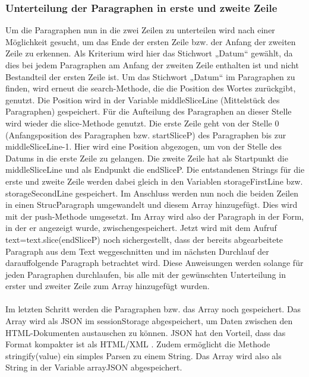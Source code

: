 \subsubsection{Unterteilung der Paragraphen in erste und zweite Zeile}
Um die Paragraphen nun in die zwei Zeilen zu unterteilen wird nach einer Möglichkeit gesucht, um das Ende der ersten Zeile bzw. der Anfang der zweiten Zeile zu erkennen. Als Kriterium wird hier das Stichwort „Datum“ gewählt, da dies bei jedem Paragraphen am Anfang der zweiten Zeile enthalten ist und nicht Bestandteil der ersten Zeile ist. Um das Stichwort „Datum“ im Paragraphen zu finden, wird erneut die search-Methode, die die Position des Wortes zurückgibt, genutzt. Die Position wird in der Variable middleSliceLine (Mittelstück des Paragraphen) gespeichert. Für die Aufteilung des Paragraphen an dieser Stelle wird wieder die slice-Methode genutzt. Die erste Zeile geht von der Stelle 0 (Anfangsposition des Paragraphen bzw. startSliceP) des Paragraphen bis zur middleSliceLine-1. Hier wird eine Position abgezogen, um von der Stelle des Datums in die erste Zeile zu gelangen. Die zweite Zeile hat als Startpunkt die middleSliceLine und als Endpunkt die endSliceP. Die entstandenen Strings für die erste und zweite Zeile werden dabei gleich in den Variablen storageFirstLine bzw. storageSecondLine gespeichert. Im Anschluss werden nun noch die beiden Zeilen in einen StrucParagraph umgewandelt und diesem Array hinzugefügt. Dies wird mit der push-Methode umgesetzt. Im Array wird also der Paragraph in der Form, in der er angezeigt wurde, zwischengespeichert. Jetzt wird mit dem Aufruf text=text.slice(endSliceP) noch sichergestellt, dass der bereits abgearbeitete Paragraph aus dem Text weggeschnitten und im nächsten Durchlauf der darauffolgende Paragraph betrachtet wird.
Diese Anweisungen werden solange für jeden Paragraphen durchlaufen, bis alle mit der gewünschten Unterteilung in erster und zweiter Zeile zum Array hinzugefügt wurden.\\
\\
Im letzten Schritt werden die Paragraphen bzw. das Array noch gespeichert. Das Array wird als \ac{JSON} im sessionStorage abgespeichert, um Daten zwischen den HTML-Dokumenten austauschen zu können. JSON hat den Vorteil, dass das Format kompakter ist als HTML/XML \cite[S. 374]{duckett}. Zudem ermöglicht die Methode stringify(value) ein simples Parsen zu einem String. Das Array wird also als String in der Variable arrayJSON abgespeichert. 


